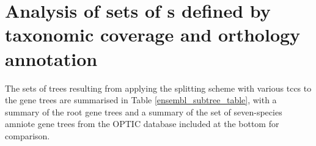 

\section{Analysis of sets of \subtr{}s defined by taxonomic coverage and orthology annotation}
\label{section_analysis_sets_subtrees}

The sets of trees resulting from applying the \subtr splitting scheme
with various \acp{tcc} to the \cmp gene trees are summarised in Table
\ref{ensembl_subtree_table}, with a summary of the root \cmp gene
trees and a summary of the set of seven-species amniote gene trees
from the OPTIC database \citep{Heger2008} included at the bottom for
comparison.


